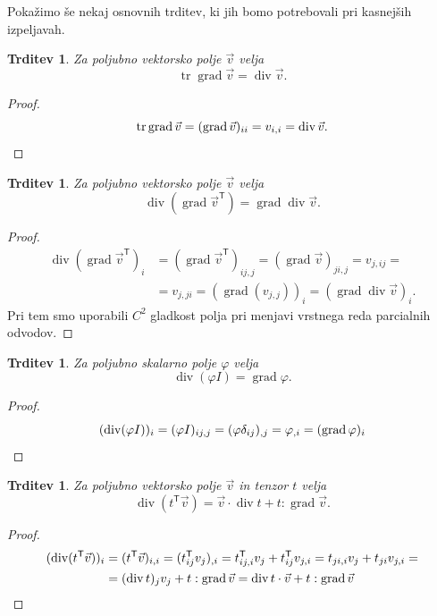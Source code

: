 \documentclass[12pt,a4paper,twoside]{article}
\theoremstyle{definition} %
\theoremstyle{plain} %
\newtheorem{trditev}[definicija]{Trditev}
\numberwithin{equation}{section}
\newcommand{\T}{\mathsf{T}}
\renewcommand{\div}{\operatorname{div}}
\newcommand{\grad}{\operatorname{grad}}
\renewcommand{\phi}{\varphi}
\newcommand{\vv}{\vec{v}}
\DeclareMathOperator{\tr}{tr}
\begin{document}
Pokažimo še nekaj osnovnih trditev, ki jih bomo potrebovali pri kasnejših
izpeljavah.
\begin{trditev}
  Za poljubno vektorsko polje $\vv$ velja
  \begin{equation}
    \tr\grad \vv = \div \vv.
  \end{equation}
\end{trditev}
\begin{proof}
\[
  \tr\grad\vv = (\grad\vv)_{ii} = v_{i,i} = \div \vv. \qedhere
\]
\end{proof}
\begin{trditev}
  Za poljubno vektorsko polje $\vv$ velja
  \begin{equation}
    \div(\grad\vv^\T) = \grad\div \vv.
  \end{equation}
\end{trditev}
\begin{proof}
  \begin{align*}
  \div(\grad \vv^\T)_i &= (\grad\vv^\T)_{ij,j} = (\grad \vv)_{ji,j} = v_{j,ij} = \\
  &= v_{j,ji} = (\grad(v_{j,j}))_i = (\grad\div \vv)_i.
  \end{align*}
  Pri tem smo uporabili $C^2$ gladkost polja pri menjavi vrstnega reda parcialnih odvodov.
\end{proof}
\begin{trditev}
  Za poljubno skalarno polje $\phi$ velja
  \begin{equation}
    \div(\phi I) = \grad \phi.
  \end{equation}
\end{trditev}
\begin{proof}
\[
  (\div(\phi I))_i = (\phi I)_{ij,j} = (\phi \delta_{ij})_{,j} = \phi_{,i} =
  (\grad \phi)_i \qedhere
\]
\end{proof}
\begin{trditev}
  Za poljubno vektorsko polje $\vv$ in tenzor $t$ velja
  \label{trd:div-tv}
  \begin{equation}
    \div(t^\T \vv) = \vv \cdot \div t + t : \grad\vv.
  \end{equation}
\end{trditev}
\begin{proof}
\begin{align*}
  (\div(t^\T \vv))_i &= (t^\T\vv)_{i,i} = (t^\T_{ij} v_j)_{,i} =
    t^\T_{ij,i} v_j + t^\T_{ij} v_{j,i} =
    t_{ji,i} v_j + t_{ji} v_{j,i} = \\ \nonumber
    &=  (\div t)_j v_j + t:\grad \vv = \div t \cdot \vv + t:\grad \vv\qedhere
\end{align*}
\end{proof}
\end{document}

